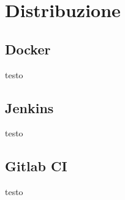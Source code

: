 \section{Distribuzione}
\subsection{Docker}
testo
\subsection{Jenkins}
testo
\subsection{Gitlab CI}
testo
